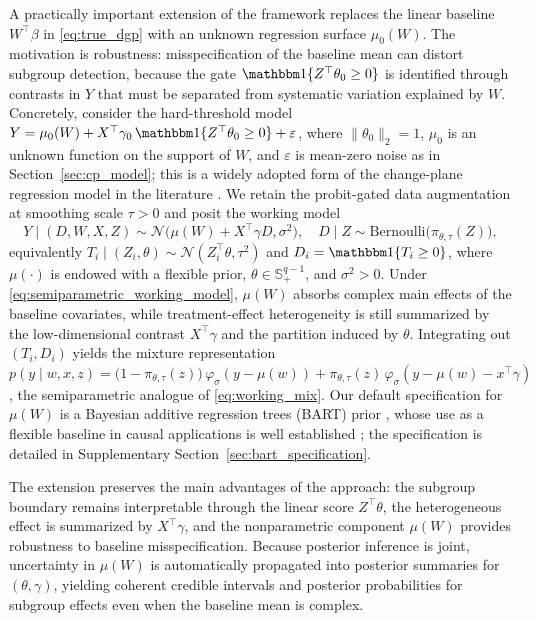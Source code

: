 \documentclass[11pt]{article}
\theoremstyle{definition}
\theoremstyle{plain}
\begin{document}
A practically important extension of the framework replaces the linear baseline $W^\top\beta$ in \eqref{eq:true_dgp} with an unknown regression surface $\mu_0(W)$. The motivation is robustness: misspecification of the baseline mean can distort subgroup detection, because the gate $\mathbbm 1\{Z^\top\theta_0\ge0\}$ is identified through contrasts in $Y$ that must be separated from systematic variation explained by $W$. Concretely, consider the hard-threshold model
$Y=\mu_0(W)+X^\top\gamma_0\,\mathbbm 1\{Z^\top\theta_0\ge0\}+\varepsilon$,
where $\|\theta_0\|_2=1$, $\mu_0$ is an unknown function on the support of $W$, and $\varepsilon$ is mean-zero noise as in Section~\ref{sec:cp_model}; this is a widely adopted form of the change-plane regression model in the literature \citep[e.g.,][]{Fan2017}.
We retain the probit-gated data augmentation at smoothing scale $\tau>0$ and posit the working model
\begin{equation}
\label{eq:semiparametric_working_model}
    Y\mid(D,W,X,Z) \sim \mathcal N\big(\mu(W)+X^\top\gamma D,\sigma^2\big), \quad
    D\mid Z \sim \mathrm{Bernoulli}\big(\pi_{\theta,\tau}(Z)\big),
\end{equation}
equivalently $T_i\mid(Z_i,\theta)\sim\mathcal N(Z_i^\top\theta,\tau^2)$ and $D_i=\mathbbm 1\{T_i\ge0\}$, where $\mu(\cdot)$ is endowed with a flexible prior, $\theta\in\mathbb S^{q-1}_+$, and $\sigma^2>0$. Under \eqref{eq:semiparametric_working_model}, $\mu(W)$ absorbs complex main effects of the baseline covariates, while treatment-effect heterogeneity is still summarized by the low-dimensional contrast $X^\top\gamma$ and the partition induced by $\theta$. Integrating out $(T_i,D_i)$ yields the mixture representation
$p(y\mid w,x,z)
=\big(1-\pi_{\theta,\tau}(z)\big)\,\varphi_{\sigma}(y-\mu(w))
+\pi_{\theta,\tau}(z)\,\varphi_{\sigma}(y-\mu(w)-x^\top\gamma)$,
the semiparametric analogue of \eqref{eq:working_mix}. Our default specification for $\mu(W)$ is a Bayesian additive regression trees (BART) prior \citep{Chipman2010}, whose use as a flexible baseline in causal applications is well established \citep{Hill2011}; the specification is detailed in Supplementary Section~\ref{sec:bart_specification}.

The extension preserves the main advantages of the approach: the subgroup boundary remains interpretable through the linear score $Z^\top\theta$, the heterogeneous effect is summarized by $X^\top\gamma$, and the nonparametric component $\mu(W)$ provides robustness to baseline misspecification. Because posterior inference is joint, uncertainty in $\mu(W)$ is automatically propagated into posterior summaries for $(\theta,\gamma)$, yielding coherent credible intervals and posterior probabilities for subgroup effects even when the baseline mean is complex.
\end{document}
